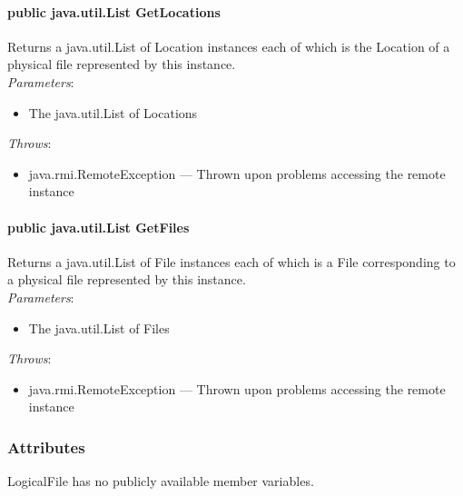 \documentclass[$Date: 2003/06/26 19:29:31 $]{glabarticle}
\begin{document}
\paragraph{public java.util.List GetLocations}

Returns a java.util.List of Location instances each of which is the Location of
a physical file represented by this instance. \\

\textit{Parameters}:
\begin{itemize}
\item[] The java.util.List of Locations
\end{itemize}

 \textit{Throws}:
 \begin{itemize}
 \item[] java.rmi.RemoteException --- Thrown upon problems accessing the remote instance 
 \end{itemize}

\paragraph{public java.util.List GetFiles}

Returns a java.util.List of File instances each of which is a File corresponding
to a physical file represented by this instance.  \\

\textit{Parameters}:
\begin{itemize}
\item[] The java.util.List of Files
\end{itemize}

 \textit{Throws}:
 \begin{itemize}
 \item[] java.rmi.RemoteException --- Thrown upon problems accessing the remote instance 
 \end{itemize}



\subsubsection{Attributes}

LogicalFile has no publicly available member variables. 

\end{document}
